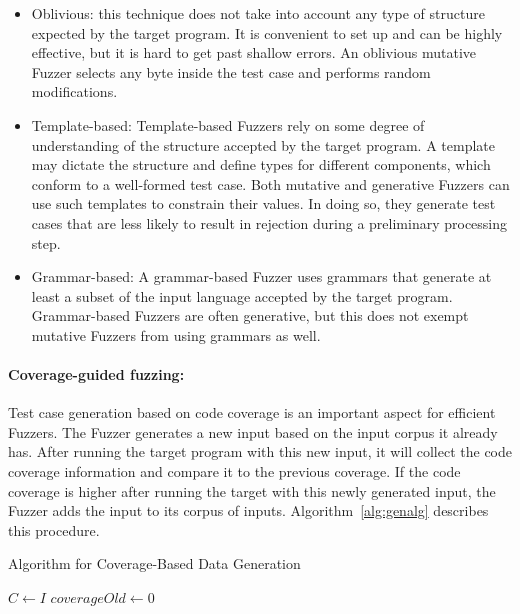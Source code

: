 \begin{itemize}
    \item Oblivious: this technique does not take into account any type of structure expected by the target program. It is convenient to set up and can be highly effective, but it is hard to get past shallow errors. An oblivious mutative Fuzzer selects any byte inside the test case and performs random modifications.
    \item Template-based: Template-based Fuzzers rely on some degree of understanding of the structure accepted by the target program. A template may dictate the structure and define types for different components, which conform to a well-formed test case. Both mutative and generative Fuzzers can use such templates to constrain their values\cite{mcnallyFuzzingStateArt2012}. In doing so,  they generate test cases that are less likely to result in rejection during a preliminary processing step.
    \item Grammar-based: A grammar-based Fuzzer uses grammars that generate at least a subset
of the input language accepted by the target program. Grammar-based Fuzzers are often generative, but this does not exempt mutative Fuzzers from using grammars as well.
\end{itemize}

\paragraph{Coverage-guided fuzzing:}

Test case generation based on code coverage is an important aspect for efficient Fuzzers.
The Fuzzer generates a new input based on the input corpus it already has. After
running the target program with this new input, it will collect the code coverage
information and compare it to the previous coverage. If the code coverage is higher after
running the target with this newly generated input, the Fuzzer adds the input to its corpus of inputs.
Algorithm~\ref{alg:genalg} describes this procedure.

\SetAlgoVlined
\begin{algorithm}[h]
  \caption{Algorithm for Coverage-Based Data Generation}\label{alg:genalg}\LinesNumberedHidden\DontPrintSemicolon
  $C \gets I$\;
  $coverageOld \gets 0$\;
\end{algorithm}

